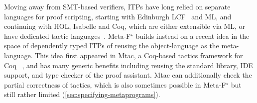 \documentclass[runningheads]{llncs}
\newcommand\metafstar{Meta-F$^\star$\xspace}
\newcommand{\comm}[3]{\ifcheckpagebudget\else\ifdraft{{\color{#1}[#2: #3]}}\fi\fi}
\newcommand{\ch}[1]{\comm{teal}{CH}{#1}}
\begin{document}
Moving away from SMT-based verifiers, ITPs have long
relied on separate languages for proof scripting,
starting with Edinburgh
LCF~\cite{gordon-edinburghLCF:1979} and ML,
%
and continuing with HOL, Isabelle and Coq, which are either extensible
via ML, or have dedicated tactic languages~\cite{isar, Delahaye00,
  AnandBCST18, StampoulisS10}.
%
%
%
%
%
%
\metafstar builds instead on a recent idea in the space of dependently
typed ITPs \cite{ZilianiDKNV15, Mtac2, ChristiansenB16,
  EbnerURAM17} of reusing the %
object-language as the meta-language.
%
This idea first appeared in Mtac, a Coq-based tactics framework
for Coq%
~\cite{ZilianiDKNV15, Mtac2},
%
and has many generic benefits including reusing the standard library,
IDE support, and type checker of the proof assistant.
%
Mtac can additionally check the partial
correctness of tactics, %
which is also sometimes possible in \metafstar but still rather limited
(\autoref{sec:specifying-metaprograms}).
%
\end{document}
